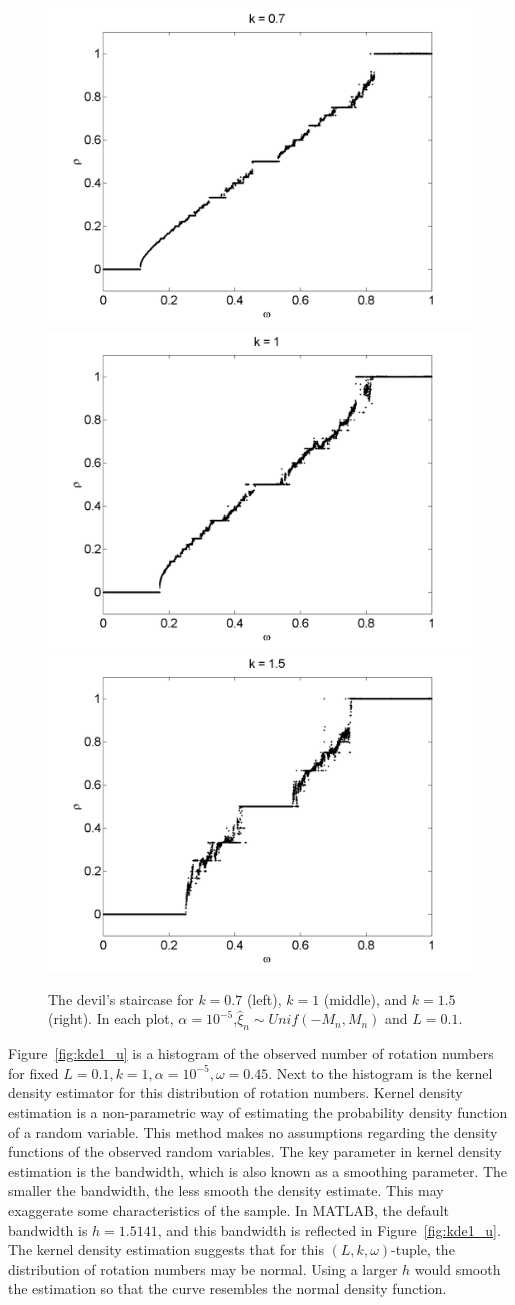 \begin{figure}[H]\linespread{1}
\caption[The devil's staircase for the random circle map, varying $k$
(uniform distribution), $\alpha = 10^{-5}$]{The devil's
  staircase for $k=0.7$ (left), $k=1$ (middle), and $k=1.5$
  (right). In each plot, $\alpha = 10^{-5}$,$\hat{\xi}_n\sim Unif(-M_n,M_n)$ and $L = 0.1$.}\label{fig:randdevil2_u}
\centering
\includegraphics[width=.33\textwidth]{figs/rcirc_u_devil_k07_L01.png}\hfill
\includegraphics[width=.33\textwidth]{figs/rcirc_u_devil_k1_L01.png}\hfill
\includegraphics[width=.33\textwidth]{figs/rcirc_u_devil_k15_L01.png}
\end{figure}

Figure~\ref{fig:kde1_u} is a histogram of the observed number of
rotation numbers for fixed $L=0.1,k=1,\alpha=10^{-5},\omega=0.45$. Next to the
histogram is the kernel density estimator for this distribution of
rotation numbers. Kernel density estimation is a non-parametric way of
estimating the probability density function of a random variable. This
method makes no assumptions regarding the density functions of the
observed random variables. The key parameter in kernel density
estimation is the bandwidth, which is also known as a smoothing
parameter. The smaller the bandwidth, the less smooth the density
estimate. This may exaggerate some characteristics of the sample. In
MATLAB, the default bandwidth is $h=1.5141$, and this bandwidth is reflected
in Figure~\ref{fig:kde1_u}. The kernel density estimation suggests
that for this $(L,k,\omega)$-tuple, the distribution of rotation numbers may be
normal. Using a larger $h$ would smooth the estimation so that the
curve resembles the normal density function. 

